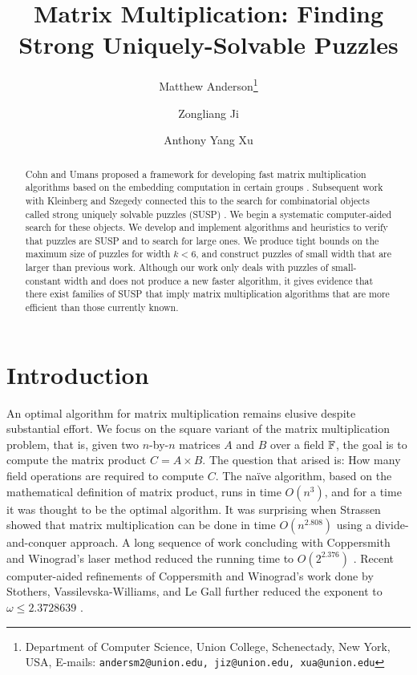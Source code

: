 \documentclass[11pt]{article}
\date{}
\title{Matrix Multiplication: Finding Strong Uniquely-Solvable Puzzles
{\IfFileExists{./sha.tex}{\\\small SHA: }{}}}
\author{
Matthew Anderson\thanks{Department of Computer Science, Union College, Schenectady, New York, USA, E-mails: \texttt{andersm2@union.edu, jiz@union.edu, xua@union.edu}}%
\and%
Zongliang Ji\samethanks[1]
\and%
Anthony Yang Xu\samethanks[1]
}
\begin{document}
\maketitle

\begin{abstract}
Cohn and Umans proposed a framework for developing fast matrix
multiplication algorithms based on the embedding computation in
certain groups \cite{cu03}.  Subsequent work with Kleinberg and
Szegedy connected this to the search for combinatorial objects called
strong uniquely solvable puzzles (SUSP) \cite{cksu05}.  We begin a
systematic computer-aided search for these objects.  We develop and
implement algorithms and heuristics to verify that puzzles are SUSP
and to search for large ones.  We produce tight bounds on the maximum
size of puzzles for width $k < 6$, and construct puzzles of small
width that are larger than previous work.  Although our work only
deals with puzzles of small-constant width and does not produce a new
faster algorithm, it gives evidence that there exist families of SUSP
that imply matrix multiplication algorithms that are more efficient
than those currently known.
\end{abstract}

\thispagestyle{empty}
\newpage
{}


\section{Introduction}
\label{sec:intro}


An optimal algorithm for matrix multiplication remains elusive
despite substantial effort.  We focus on the square variant of the
matrix multiplication problem, that is, given two $n$-by-$n$ matrices
$A$ and $B$ over a field $\F$, the goal is to compute the matrix
product $C = A \times B$.  The question that arised is: How many field
operations are required to compute $C$.  The na\"{i}ve algorithm,
based on the mathematical definition of matrix product, runs in time
$O(n^3)$, and for a time it was thought to be the optimal algorithm.
It was surprising when Strassen showed that matrix multiplication can
be done in time $O(n^{2.808})$ \cite{str69} using a
divide-and-conquer approach.  A long sequence of work concluding with
Coppersmith and Winograd's laser method reduced the running time
to $O(2^{2.376})$ \cite{pan78,b79,sch81,cw82,str86,cw87}. Recent
computer-aided refinements of Coppersmith and Winograd's work done by
Stothers, Vassilevska-Williams, and Le Gall further reduced the
exponent to $\omega \le 2.3728639$ \cite{sto10,vas11,leg14}.
\end{document}
